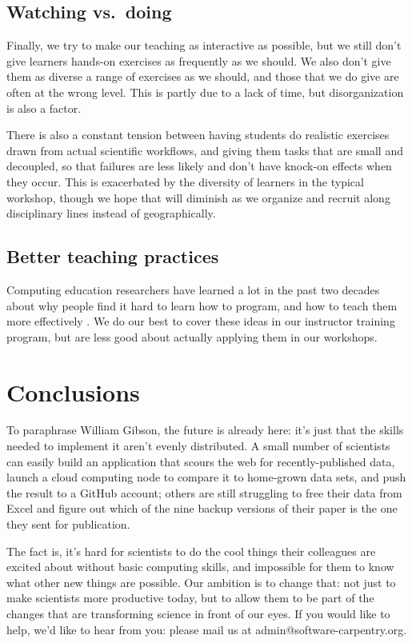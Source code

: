 \documentclass[10pt,a4paper,twocolumn]{article}
\begin{document}
\subsection*{Watching vs.~doing}

Finally, we try to make our teaching as interactive as possible, but
we still don't give learners hands-on exercises as frequently as we
should.  We also don't give them as diverse a range of exercises as we
should, and those that we do give are often at the wrong level. This
is partly due to a lack of time, but disorganization is also a factor.

There is also a constant tension between having students do realistic
exercises drawn from actual scientific workflows, and giving them tasks
that are small and decoupled, so that failures are less likely and don't
have knock-on effects when they occur. This is exacerbated by the
diversity of learners in the typical workshop, though we hope that will
diminish as we organize and recruit along disciplinary lines instead of
geographically.

\subsection*{Better teaching practices}

Computing education researchers have learned a lot in the past two
decades about why people find it hard to learn how to program, and how
to teach them more effectively
\cite{guzdial2010,guzdial2013,hazzan2011,porter2013,sorva2012}.  We
do our best to cover these ideas in our instructor training program,
but are less good about actually applying them in our workshops.

\section*{Conclusions}

To paraphrase William Gibson, the future is already here: it's just
that the skills needed to implement it aren't evenly distributed. A
small number of scientists can easily build an application that scours
the web for recently-published data, launch a cloud computing node to
compare it to home-grown data sets, and push the result to a GitHub
account; others are still struggling to free their data from Excel and
figure out which of the nine backup versions of their paper is the one
they sent for publication.

The fact is, it's hard for scientists to do the cool things their
colleagues are excited about without basic computing skills, and
impossible for them to know what other new things are possible. Our
ambition is to change that: not just to make scientists more productive
today, but to allow them to be part of the changes that are transforming
science in front of our eyes. If you would like to help, we'd like to
hear from you: please mail us at admin@software-carpentry.org.
\end{document}
